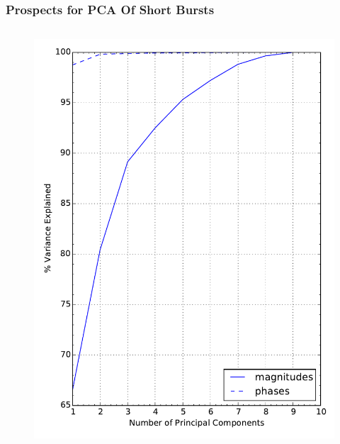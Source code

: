 \documentclass[serif,mathserif]{beamer}
\begin{document}
\begin{frame}
    \frametitle{Prospects for PCA Of Short Bursts}

    \begin{columns}[]


        \begin{center}
            \vspace{-0.5cm}
            \begin{figure}
                \includegraphics[width=\columnwidth]{figures/explained_variance.pdf}
            \end{figure}
        \end{center}



\end{columns}
\end{frame}
\end{document}
